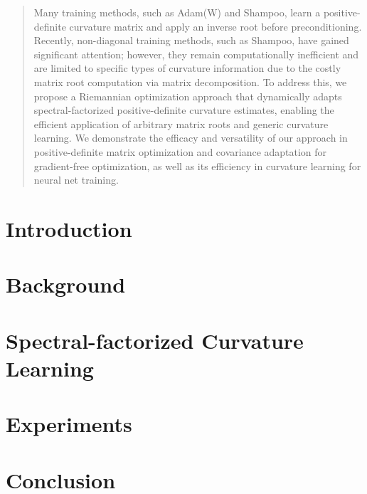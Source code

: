 \documentclass{article}
\begin{document}

\begin{abstract}
Many training methods, such as Adam(W) and Shampoo, learn a positive-definite curvature matrix and apply an inverse root before preconditioning. Recently, non-diagonal training methods, such as Shampoo, have gained significant attention; however, they remain computationally inefficient and are limited to specific types of curvature information due to the costly matrix root computation via matrix decomposition.
To address this, we propose a Riemannian optimization approach that dynamically adapts spectral-factorized positive-definite curvature estimates, enabling the efficient application of arbitrary matrix roots and generic curvature learning.
We demonstrate the efficacy and versatility of our approach in positive-definite matrix optimization and covariance adaptation for gradient-free optimization, as well as its efficiency in curvature learning for neural net training.

\vspace{-0.2cm}
\end{abstract}

%
\vspace{-0.65cm}
\section{Introduction}


\vspace{-0.5cm}
\section{Background}
\label{sec:background}


\vspace{-0.4cm}
\section{
Spectral-factorized Curvature Learning
}\label{sec:fast-fngd}


\vspace{-0.4cm}
\section{Experiments}
\label{sec:expriments}


\vspace{-0.35cm}
\section{Conclusion}





%
%



%
%




\newpage
\appendix
\onecolumn

\end{document}
